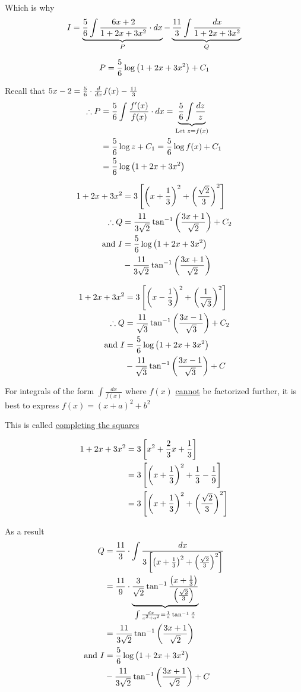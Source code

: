 \documentclass[14pt,fleqn]{extarticle}
\begin{document}
Which is why 
\[ I = \underbrace{\frac{5}{6}\int \frac{6x+2}{1+2x+3x^2}\cdot dx }_P - \underbrace{\frac{11}{3}\int \frac{dx}{1+2x+3x^2}}_Q \]

\newcard 

\[ P = \frac{5}{6}\log \left(1+2x+3x^2 \right) + C_1 \]

\newcard 

Recall that  $5x-2 = \frac{5}{6}\cdot\frac{d}{dx} f(x) -\frac{11}{3}$ 
\begin{align}
	\therefore P &= \frac{5}{6}\int \frac{f'(x)}{f(x)}\cdot dx = \underbrace{\frac{5}{6}\int \frac{dz}{z}}_{\text{Let } z = f(x)} \\
	&= \frac{5}{6}\log z + C_1 = \frac{5}{6}\log f(x) + C_1 \\
	&= \frac{5}{6}\log \left(1+2x+3x^2 \right) 
\end{align}

\newcard 

\begin{align}
	1+2x+3x^2 &= 3 \left[ \left(x + \frac{1}{3} \right)^2  + \left(\frac{\sqrt{2}}{3} \right)^2 \right] \\
	\therefore Q &= \frac{11}{3\sqrt{2}}\tan^{-1} \left( \frac{3x+1}{\sqrt{2}}\right) + C_2 \\
	\text{and } I &= \frac{5}{6}\log \left(1+2x+3x^2 \right) \\ 
	&- \frac{11}{3\sqrt{2}}\tan^{-1} \left( \frac{3x+1}{\sqrt{2}}\right) 
\end{align}

\newcard 
\begin{align}
	1+2x+3x^2 &= 3 \left[ \left(x-\frac{1}{3} \right)^2  + \left(\frac{1}{\sqrt{3}} \right)^2 \right] \\
	\therefore Q &= \frac{11}{\sqrt{3}}\tan^{-1} \left(\frac{3x-1}{\sqrt{3}} \right) + C_2 \\
	\text{and } I &= \frac{5}{6}\log \left(1+2x+3x^2 \right) \\
	&- \frac{11}{\sqrt{3}}\tan^{-1} \left(\frac{3x-1}{\sqrt{3}} \right) + C  
\end{align}

\newcard 

For integrals of the form $\int \frac{dx}{f(x)}$ where $f(x)$ \underline{cannot} be 
factorized further, it is best to express $f(x) = (x+a)^2 + b^2$ \newline 

This is called \underline{completing the squares}

\begin{align}
	1+2x+3x^2 &= 3 \left[x^2 + \frac{2}{3}x + \frac{1}{3} \right] \\
	&= 3 \left[\left(x + \frac{1}{3} \right)^2 + \frac{1}{3} - \frac{1}{9} \right] \\
	&= 3 \left[\left(x + \frac{1}{3} \right)^2 + \left(\frac{\sqrt{2}}{3} \right)^2 \right]
\end{align}

As a result 
\begin{align}
Q &= \frac{11}{3}\cdot \int \frac{dx}{3 \left[\left(x + \frac{1}{3} \right)^2 + \left(\frac{\sqrt{2}}{3} \right)^2 \right]} \\
&= \frac{11}{9}\cdot \underbrace{\frac{3}{\sqrt{2}}\tan^{-1} \frac{\left(x + \frac{1}{3} \right)}{\left(\frac{\sqrt{2}}{3} \right)}}_{\int \frac{dx}{x^2 + a^2} = \frac{1}{a}\tan^{-1} \frac{x}{a}} \\
&= \frac{11}{3\sqrt{2}}\tan^{-1} \left( \frac{3x+1}{\sqrt{2}}\right) \\
\text{and } I &= \frac{5}{6}\log \left(1+2x+3x^2 \right)  \\
&- \frac{11}{3\sqrt{2}}\tan^{-1} \left( \frac{3x+1}{\sqrt{2}}\right) + C 
\end{align}
\end{document}
